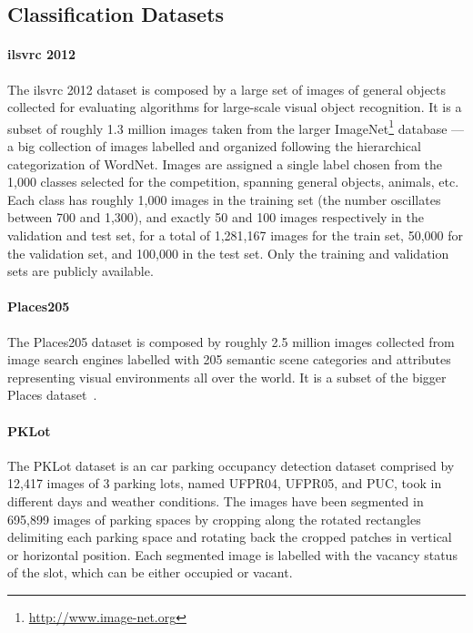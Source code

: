 \subsection{Classification Datasets}

\paragraph{\acrfull{ilsvrc} 2012~~\cite{russakovsky2015imagenet}}
The \acrfull{ilsvrc} 2012 dataset is composed by a large set of images of general objects collected for evaluating algorithms for large-scale visual object recognition.
It is a subset of roughly 1.3 million images taken from the larger ImageNet\footnote{\url{http://www.image-net.org}} database --- a big collection of images labelled and organized following the hierarchical categorization of WordNet.
Images are assigned a single label chosen from the 1,000 classes selected for the competition, spanning general objects, animals, etc.
Each class has roughly 1,000 images in the training set (the number oscillates between 700 and 1,300), and exactly 50 and 100 images respectively in the validation and test set, for a total of 1,281,167 images for the train set, 50,000 for the validation set, and 100,000 in the test set.
Only the training and validation sets are publicly available.

\paragraph{Places205~\cite{zhou2014learning}}
The Places205 dataset is composed by roughly 2.5 million images collected from image search engines labelled with 205 semantic scene categories and attributes representing visual environments all over the world.
It is a subset of the bigger Places dataset~\cite{zhou2016places}.

\paragraph{PKLot~\cite{de2015pklot}}
The PKLot dataset is an car parking occupancy detection dataset comprised by 12,417 images of 3 parking lots, named UFPR04, UFPR05, and PUC, took in different days and weather conditions.
The images have been segmented in 695,899 images of parking spaces by cropping along the rotated rectangles delimiting each parking space and rotating back the cropped patches in vertical or horizontal position.
Each segmented image is labelled with the vacancy status of the slot, which can be either occupied or vacant.


